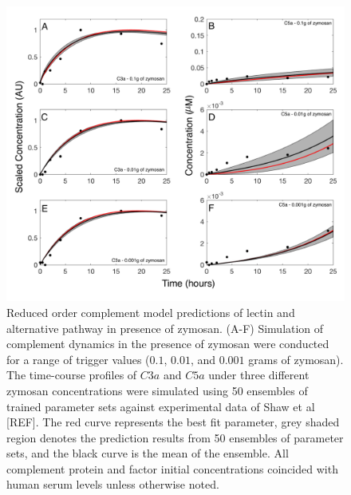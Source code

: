 \documentclass[12pt]{article}
\begin{document}
\begin{figure}[h]
\centering
\includegraphics[width=1.0\textwidth]{./Figures/Figure3_Predictions_2.pdf}
\caption{Reduced order complement model predictions of lectin and alternative pathway in presence of zymosan. (A-F) Simulation of complement dynamics in the presence of zymosan were conducted for a range of trigger values ($0.1$, $0.01$, and $0.001$ grams of zymosan). The time-course profiles of $C3a$ and $C5a$ under three different zymosan concentrations were simulated using 50 ensembles of trained parameter sets against experimental data of Shaw et al [REF].  The red curve represents the best fit parameter, grey shaded region denotes the prediction results from 50 ensembles of parameter sets, and the black curve is the mean of the ensemble. All complement protein and factor initial concentrations coincided with human serum levels unless otherwise noted.}
\label{fig-prediction}
\end{figure}
\end{document}
